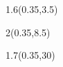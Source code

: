 \null\cleardoublepage


\begin{textblock*}{1.6\TPHorizModule}(0.35\TPHorizModule,3.5\TPVertModule)
  \titlefmt
\end{textblock*}

\begin{textblock*}{2\TPHorizModule}(0.35\TPHorizModule,8.5\TPVertModule)
  \affiliations
\end{textblock*}

\begin{textblock*}{1.7\TPHorizModule}(0.35\TPHorizModule,30\TPVertModule)
  \edition
\end{textblock*}
\endgroup

